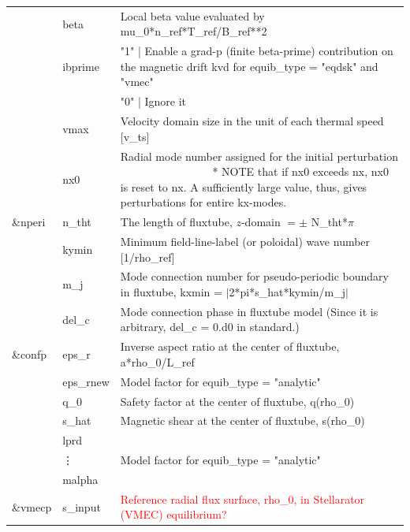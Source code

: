 \begin{longtable}{ l | l | p{10cm} }
              \cline{2-3}
            ~ & beta & Local beta value evaluated by mu\_0*n\_ref*T\_ref/B\_ref**2 \\
              \cline{2-3}
            ~ & ibprime & "1" | Enable a grad-p (finite beta-prime) contribution on the magnetic drift kvd
                                       for equib\_type = "eqdsk" and "vmec"\\
            ~ &         ~ & "0" | Ignore it\\
              \cline{2-3}
            ~ & vmax & Velocity domain size in the unit of each thermal speed [v\_ts]\\
              \cline{2-3}
            ~ & nx0 & Radial mode number assigned for the initial perturbation ~~~~~~~~~~~~~~~~
                          * NOTE that if nx0 exceeds nx, nx0 is reset to nx.
                             A sufficiently large value, thus, gives perturbations for entire kx-modes.\\
  \hline
  \&nperi & n\_tht & The length of fluxtube, $z$-domain $= \pm$ N\_tht*$\pi$\\
             \cline{2-3}
           ~ & kymin & Minimum field-line-label (or poloidal) wave number [1/rho\_ref]\\
             \cline{2-3}
           ~ & m\_j & Mode connection number for pseudo-periodic boundary in fluxtube, kxmin = $|$2*pi*s\_hat*kymin/m\_j$|$\\
             \cline{2-3}
           ~ & del\_c & Mode connection phase in fluxtube model (Since it is arbitrary, del\_c = 0.d0 in standard.)\\
  \hline
  \&confp & eps\_r & Inverse aspect ratio at the center of fluxtube, a*rho\_0/L\_ref\\
              \cline{2-3}
            ~ & eps\_rnew & Model factor for equib\_type = "analytic"\\
              \cline{2-3}
            ~ & q\_0 & Safety factor at the center of fluxtube, q(rho\_0)\\
              \cline{2-3}
            ~ & s\_hat & Magnetic shear at the center of fluxtube, s(rho\_0)\\
              \cline{2-3}
            ~ & lprd & ~\\
            ~ & \vdots & Model factor for equib\_type = "analytic"\\
            ~ & malpha & ~ \\
  \hline
  \&vmecp & s\_input & \textcolor{red}{Reference radial flux surface, rho\_0, in Stellarator (VMEC) equilibrium?}\\

\end{longtable}
